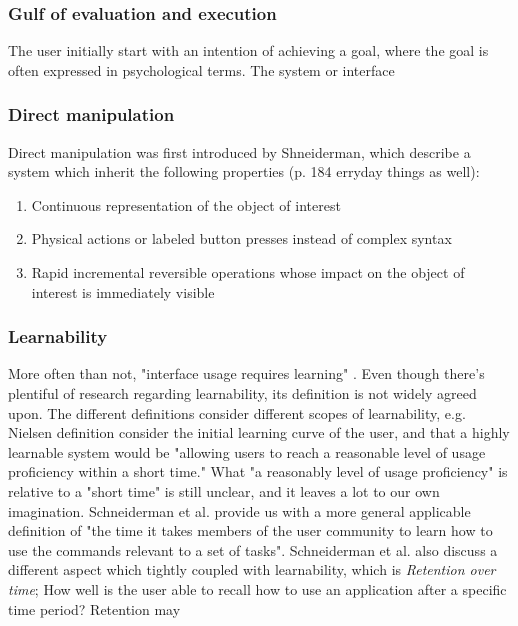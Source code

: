 
\subsubsection{Gulf of evaluation and execution}
The user initially start with an intention of achieving a goal, where the goal is often expressed in psychological terms. The system or interface

\subsubsection{Direct manipulation}

Direct manipulation was first introduced by Shneiderman, which describe a system which inherit the following properties (p. 184 erryday things as well):

\begin{enumerate}
  \item Continuous representation of the object of interest
  \item Physical actions or labeled button presses instead of complex syntax
  \item Rapid incremental reversible operations whose impact on the object of interest is immediately visible
\end{enumerate}

\subsubsection{Learnability}
More often than not, "interface usage requires learning" \cite{Grossman2009}. Even though there’s plentiful of research regarding learnability, its definition is not widely agreed upon. The different definitions consider different scopes of learnability, e.g. Nielsen definition consider the initial learning curve of the user, and that a highly learnable system would be "allowing users to reach a reasonable level of usage proficiency within a short time." What "a reasonably level of usage proficiency" is relative to a "short time" is still unclear, and it leaves a lot to our own imagination. Schneiderman et al. provide us with a more general applicable definition of "the time it takes members of the user community to learn how to use the commands relevant to a set of tasks". Schneiderman et al. also discuss a different aspect which tightly coupled with learnability, which is \textit{Retention over time}; How well is the user able to recall how to use an application after a specific time period? Retention may

